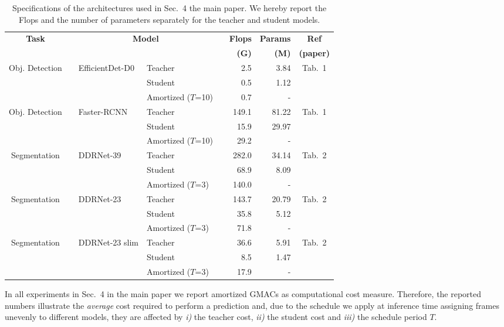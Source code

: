 \documentclass[runningheads]{llncs}
\begin{document}
\begin{table}[tb]
\centering
\caption{Specifications of the architectures used in Sec.~4 the main paper. We hereby report the Flops and the number of parameters separately for the teacher and student models.}
\label{tab:teacher_student_specs}
\begin{tabular}{cm{1em}llm{1em}rrc}
\toprule
\multirow{2}{*}{\textbf{Task}} && \multicolumn{2}{c}{\multirow{2}{*}{\textbf{Model}}} && \textbf{Flops} & \textbf{Params} & \textbf{Ref}\\
&& & && \textbf{(G)} & \textbf{(M)} & \textbf{(paper)}\\
\midrule
\multirow{3}{*}{Obj. Detection} && \multirow{3}{*}{EfficientDet-D0} & Teacher && 2.5 & 3.84 & \multirow{3}{*}{Tab.~1}\\
&& & Student && 0.5 & 1.12\\
&& & Amortized ($T$=10)&& 0.7 & -\\
\midrule
\multirow{3}{*}{Obj. Detection} && \multirow{3}{*}{Faster-RCNN} & Teacher && 149.1 & 81.22 & \multirow{3}{*}{Tab.~1}\\
&& & Student && 15.9 & 29.97\\
&& & Amortized ($T$=10) && 29.2 & -\\
\midrule
\multirow{3}{*}{Segmentation} && \multirow{3}{*}{DDRNet-39} & Teacher && 282.0 & 34.14 & \multirow{3}{*}{Tab.~2}\\
&& & Student && 68.9 & 8.09\\
&& & Amortized ($T$=3) && 140.0 & -\\
\midrule
\multirow{3}{*}{Segmentation} && \multirow{3}{*}{DDRNet-23} & Teacher && 143.7 & 20.79 & \multirow{3}{*}{Tab.~2}\\
&& & Student && 35.8 & 5.12\\
&& & Amortized ($T$=3) && 71.8 & -\\
\midrule
\multirow{3}{*}{Segmentation} && \multirow{3}{*}{DDRNet-23 slim} & Teacher && 36.6 & 5.91 & \multirow{3}{*}{Tab.~2}\\
&& & Student && 8.5 & 1.47\\
&& & Amortized ($T$=3) && 17.9 & -\\
\bottomrule
\end{tabular}\end{table} In all experiments in Sec.~4 in the main paper we report amortized GMACs as computational cost measure.
Therefore, the reported numbers illustrate the \emph{average} cost required to perform a prediction and, due to the schedule we apply at inference time assigning frames unevenly to different models, they are affected by \emph{i)} the teacher cost, \emph{ii)} the student cost and \emph{iii)} the schedule period $T$.
\end{document}

